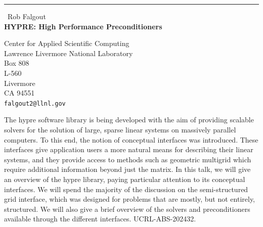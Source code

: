 \documentclass{report}
\begin{document}
\begin{center}
\rule{6in}{1pt} \
{\large Rob Falgout \\
{\bf {HYPRE}: High Performance Preconditioners}}

Center for Applied Scientific Computing \\ Lawrence Livermore National Laboratory \\ Box 808 \\ L-560 \\ Livermore \\ CA 94551
\\
{\tt falgout2@llnl.gov}\end{center}

The hypre software library is being developed with the aim of providing scalable solvers for the solution of large, sparse linear systems on massively parallel computers. To this end, the notion of conceptual interfaces was introduced. These interfaces give application users a more natural means for describing their linear systems, and they provide access to methods such as geometric multigrid which require additional information beyond just the matrix. In this talk, we will give an overview of the hypre library, paying particular attention to its conceptual interfaces. We will spend the majority of the discussion on the semi-structured grid interface, which was designed for problems that are mostly, but not entirely, structured. We will also give a brief overview of the solvers and preconditioners available through the different interfaces. UCRL-ABS-202432.
\end{document}
